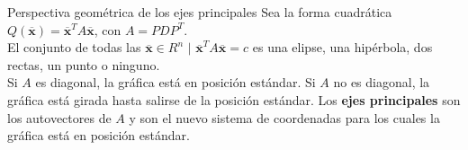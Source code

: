 \documentclass[a4paper, twoside]{article}
\numberwithin{equation}{section}
\numberwithin{figure}{section}
\numberwithin{table}{section}
\newcommand{\vect}[1]{\overline{\textbf{#1}}}
\begin{document}
\begin{corolario*}{Perspectiva geométrica de los ejes principales}
	Sea la forma cuadrática $Q(\vect{x})=\vect{x}^T A \vect{x}$, con $A=PDP^T$.\\
	
	El conjunto de todas las $\vect{x} \in R^n$ $\vert$ $\vect{x}^T A \vect{x}=c$ es una elipse, una hipérbola, dos rectas, un punto o ninguno.\\
	
	Si $A$ es diagonal, la gráfica está en posición estándar. Si $A$ no es diagonal, la gráfica está girada hasta salirse de la posición estándar. Los \textbf{ejes principales} son los autovectores de $A$ y son el nuevo sistema de coordenadas para los cuales la gráfica está en posición estándar.
\end{corolario*}
\end{document}
